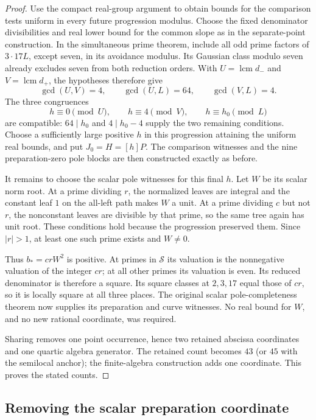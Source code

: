 \documentclass[11pt]{article}
\theoremstyle{definition}
\begin{document}
\begin{proof}
Use the compact real-group argument to obtain bounds for the comparison
tests uniform in every future progression modulus.  Choose the fixed
denominator divisibilities and real lower bound for the common slope as
in the separate-point construction.  In the simultaneous prime theorem,
include all odd prime factors of $3\cdot17L$, except seven, in its avoidance
modulus.  Its Gaussian class modulo seven already excludes seven from
both reduction orders.  With $U=\operatorname{lcm}d_-$ and
$V=\operatorname{lcm}d_+$, the hypotheses therefore give
\[
 \gcd(U,V)=4,\qquad \gcd(U,L)=64,\qquad \gcd(V,L)=4.
\]
The three congruences
\[
 h\equiv0\pmod U,\qquad h\equiv4\pmod V,
 \qquad h\equiv h_0\pmod L
\]
are compatible: $64\mid h_0$ and $4\mid h_0-4$ supply the two remaining
conditions.  Choose a sufficiently large positive $h$ in this progression
attaining the uniform real bounds, and put $J_0=H=[h]P$.
The comparison witnesses and the nine preparation-zero pole blocks are
then constructed exactly as before.

It remains to choose the scalar pole witnesses for this final $h$.
Let $W$ be its scalar norm root.  At a prime dividing $r$, the normalized
leaves are integral and the constant leaf $1$ on the all-left path makes
$W$ a unit.  At a prime dividing $c$ but not $r$, the nonconstant leaves
are divisible by that prime, so the same tree again has unit root.
These conditions hold because the progression preserved them.  Since
$|r|>1$, at least one such prime exists and $W\ne0$.

Thus $b_*=crW^2$ is positive.  At primes in $\mathcal S$ its valuation is
the nonnegative valuation of the integer $cr$; at all other primes its
valuation is even.  Its reduced denominator is therefore a square.
Its square classes at $2,3,17$ equal those of $cr$, so it is locally square
at all three places.  The original scalar pole-completeness theorem now
supplies its preparation and curve witnesses.  No real bound for $W$,
and no new rational coordinate, was required.

Sharing removes one point occurrence, hence two retained abscissa
coordinates and one quartic algebra generator.  The retained count becomes
$43$ (or $45$ with the semilocal anchor); the finite-algebra construction
adds one coordinate.  This proves the stated counts.
\end{proof}


\subsection{Removing the scalar preparation coordinate}
\label{subsec:scalar-preparation-zero}
\end{document}

